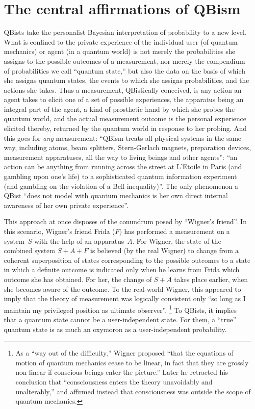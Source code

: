 \documentclass[smallextended]{svjour3}
\begin{document}
\section{The central affirmations of QBism}\label{sec.ca}
QBists take the personalist Bayesian interpretation of probability to a new level. What is confined to the private {experience} of the individual user (of quantum mechanics) or agent (in a quantum world) is not merely the probabilities she assigns to the possible outcomes of a measurement, nor merely the compendium of probabilities we call ``{quantum state},'' but also the data on the basis of which she assigns quantum states, the events to which she assigns probabilities, and the actions she takes. Thus a measurement, QBistically conceived, is any action an agent takes to elicit one of a set of possible experiences, the apparatus being an integral part of the agent, a kind of {prosthetic hand} by which she probes the quantum world, and the actual measurement outcome is the personal experience elicited thereby, returned by the quantum world in response to her probing.\cite{FS2013} And this goes for \emph{any} measurement: ``QBism treats all physical systems in the same way, including atoms, beam splitters, Stern-Gerlach magnets, preparation devices, measurement apparatuses, all the way to living beings and other agents''\cite{FS2015}: ``an action can be anything from running across the street at L'Etoile in Paris (and gambling upon one's life) to a sophisticated quantum information experiment (and gambling on the violation of a Bell inequality)''.\cite{Fuchs_Notwithstanding} The only phenomenon a QBist ``does not model with quantum mechanics is her own direct internal awareness of her own private {experience}''.\cite{FMS2014}

This approach at once disposes of the {conundrum} posed by ``{Wigner's friend}''.\cite{Wigner} In this scenario, Wigner's friend Frida ($F$) has performed a measurement on a system~$S$ with the help of an apparatus~$A$. For Wigner, the state of the combined system $S+A+F$ is believed (by the real Wigner) to change from a coherent superposition of states corresponding to the possible outcomes to a state in which a definite outcome is indicated only when he learns from Frida which outcome she has obtained. For her, the change of $S+A$ takes place earlier, when {she} becomes aware of the outcome. To the real-world Wigner, this appeared to imply that the theory of measurement was logically consistent only ``so long as I maintain my privileged position as ultimate observer''.%
\footnote{As a ``way out of the difficulty,'' Wigner\cite{Wigner} proposed ``that the equations of motion of quantum mechanics cease to be linear, in fact that they are grossly non-linear if conscious beings enter the picture.'' Later he retracted his conclusion that ``consciousness enters the theory unavoidably and unalterably,'' and affirmed instead that consciousness was outside the scope of quantum mechanics.\cite{Wigner1977}}
To QBists, it implies that a quantum state cannot be a user-independent state. For them, a ``true'' quantum state is as much an oxymoron as a user-independent probability.
\end{document}

